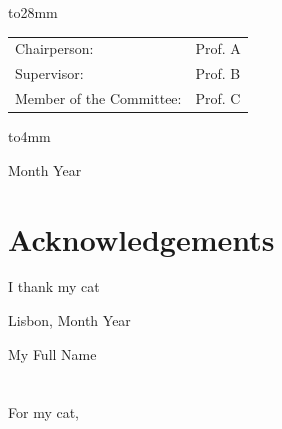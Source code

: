 \begin{singlespace}
{\vbox to28mm{
\vfil
{\large
\begin{center}
\begin{tabular}{p{}l}
Chairperson: &  Prof. A \\
Supervisor: & Prof. B\\
Member of the Committee: & Prof. C \\
\end{tabular}
\end{center}
}
\vfil
}%
\vskip28mm%
\vbox to4mm{\Large\bf
\vfil
\begin{center}
Month Year
\end{center}
\vfil
}%
}%
\end{singlespace}
\newpage

\chapter*{Acknowledgements}
\thispagestyle{empty}

I thank my cat

\vfill
\begin{flushright}
  \begin{minipage}{8cm}
    \begin{center}
      Lisbon, Month Year

      My Full Name
    \end{center}
  \end{minipage}
\end{flushright}

\cleardoublepage


\chapter*{}
\thispagestyle{empty}

\vfill
\mbox{}
\vfill\Large
\begin{flushright}
  \begin{minipage}{8cm}
    \begin{center}

For my cat,\\

    \end{center}
  \end{minipage}
\end{flushright}
\normalsize\vfill

